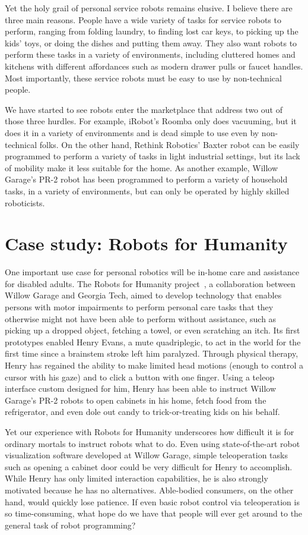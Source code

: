 \documentclass[10pt,twocolumn]{article}
\begin{document}
Yet the holy grail of personal service robots remains elusive. I believe there are three main reasons. People have a wide variety of tasks for service robots to perform, ranging from folding laundry, to finding lost car keys, to picking up the kids' toys, or doing the dishes and putting them away. They also want robots to perform these tasks in a variety of environments, including cluttered homes and kitchens with different affordances such as modern drawer pulls or faucet handles. Most importantly, these service robots must be easy to use by non-technical people.

We have started to see robots enter the marketplace that address two out of those three hurdles. For example, iRobot's Roomba only does vacuuming, but it does it in a variety of environments and is dead simple to use even by non-technical folks. On the other hand, Rethink Robotics' Baxter robot can be easily programmed to perform a variety of tasks in light industrial settings, but its lack of mobility make it less suitable for the home. As another example, Willow Garage's PR-2 robot has been programmed to perform a variety of household tasks, in a variety of environments, but can only be operated by highly skilled roboticists.

\section{Case study: Robots for Humanity}

One important use case for personal robotics will be in-home care and assistance for disabled adults. The Robots for Humanity project~\cite{rfh}, a collaboration between Willow Garage and Georgia Tech, aimed to develop technology that enables persons with motor impairments to perform personal care tasks that they otherwise might not have been able to perform without assistance, such as picking up a dropped object, fetching a towel, or even scratching an itch. Its first prototypes enabled Henry Evans, a mute quadriplegic, to act in the world for the first time since a brainstem stroke left him paralyzed. Through physical therapy, Henry has regained the ability to make limited head motions (enough to control a cursor with his gaze) and to click a button with one finger.  Using a teleop interface custom designed for him, Henry has been able to instruct Willow Garage's PR-2 robots to open cabinets in his home, fetch food from the refrigerator, and even dole out candy to trick-or-treating kids on his behalf.

Yet our experience with Robots for Humanity underscores how difficult it is for ordinary mortals to instruct robots what to do. Even using state-of-the-art robot visualization software developed at Willow Garage, simple teleoperation tasks such as opening a cabinet door could be very difficult for Henry to accomplish. While Henry has only limited interaction capabilities, he is also strongly motivated because he has no alternatives. Able-bodied consumers, on the other hand, would quickly lose patience. If even basic robot control via teleoperation is so time-consuming, what hope do we have that people will ever get around to the general task of robot programming?
\end{document}
